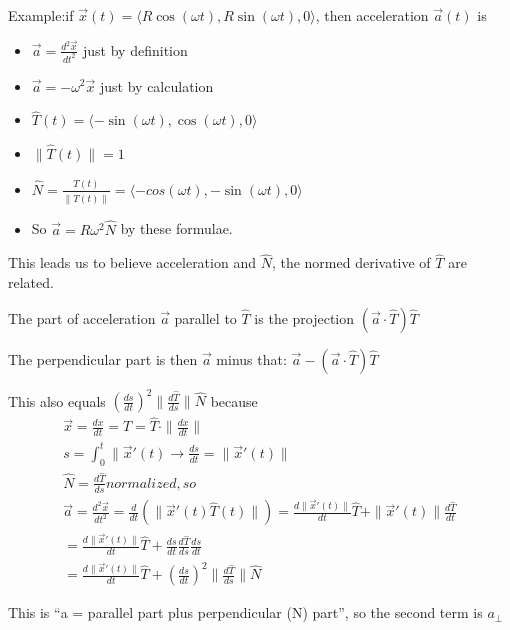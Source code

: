 \documentclass[11pt, oneside]{article}   	%
\begin{document}
Example:if  $\overrightarrow{x}(t) = \langle R\cos(\omega t), R\sin(\omega t), 0 \rangle$, then acceleration $\overrightarrow{a}(t)$ is
\begin{itemize}
\item $\overrightarrow{a} = \frac{d^2\overrightarrow{x}}{dt^2}$ just by definition
\item $\overrightarrow{a} = -\omega^2 \overrightarrow{x}$ just by calculation
\item $\hat{T}(t) = \langle -\sin(\omega t), \cos (\omega t), 0 \rangle$
\item $\| \hat{T}(t) \| = 1$
\item $\hat{N} = \frac{\hat{T}(t)} { \| \hat{T}(t) \|} =  \langle -cos(\omega t), -\sin (\omega t), 0 \rangle$
\item So $\overrightarrow{a} = R\omega^2\hat{N}$ by these formulae.
\end{itemize}

This leads us to believe acceleration and $\hat{N}$, the normed derivative of $\hat{T}$ are related.

The part of acceleration $\overrightarrow{a}$ parallel to $\hat{T}$ is the projection $(\overrightarrow{a} \cdot \hat{T}) \hat{T}$

The perpendicular part is then $\overrightarrow{a}$ minus that: $\overrightarrow{a} - (\overrightarrow{a} \cdot \hat{T}) \hat{T}$

This also equals $(\frac{ds}{dt})^2 \|\frac{d\hat{T}}{ds} \| \hat{N}$ because
\begin{align}
\overrightarrow{x} = \frac{dx}{dt} = T = \hat{T} \cdot \|  \frac{dx}{dt} \| \\
s = \int_0^t \| \overrightarrow{x}'(t) \rightarrow \frac{ds}{dt} = \| \overrightarrow{x}'(t) \|  \\
\hat{N} = \frac{d\hat{T}}{ds} normalized, so \\
\overrightarrow{a} = \frac{d^2\overrightarrow{x}}{dt^2} = \frac{d}{dt}(\| \overrightarrow{x}'(t)\hat{T}(t)\|) = \frac{d \|\overrightarrow{x}'(t) \|}{dt}\hat{T} + \| \overrightarrow{x}'(t) \| \frac{d\hat{T}}{dt} \\
= \frac{d \|\overrightarrow{x}'(t) \|}{dt}\hat{T} + \frac{ds}{dt} \frac{d\hat{T}}{ds} \frac{ds}{dt} \\ 
= \frac{d \|\overrightarrow{x}'(t) \|}{dt}\hat{T} + (\frac{d{s}}{dt} )^2 \| \frac{d\hat{T}}{ds} \| \hat{N}
\end{align}

This is ``a = parallel part plus perpendicular (N) part'', so the second term is $a_{\bot}$
\end{document}
